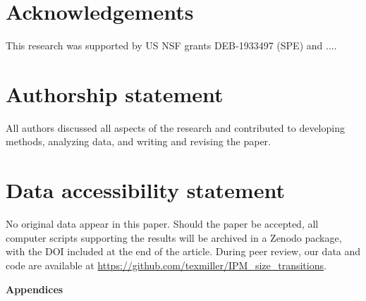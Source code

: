 \documentclass[12pt]{article}
\begin{document}
\section*{Acknowledgements} 
This research was supported by US NSF grants DEB-1933497 (SPE) and .... 

\section{Authorship statement} 
All authors discussed all aspects of the research and contributed to developing methods, analyzing data, and writing and revising the paper.  

\section{Data accessibility statement}
No original data appear in this paper. Should the paper be accepted, all computer scripts supporting the results will be archived in a Zenodo package, with the DOI included at the end of the article. 
During peer review, our data and code are available at \url{https://github.com/texmiller/IPM_size_transitions}. 
	
\newpage 

%



\newpage 
\clearpage 
\setcounter{equation}{0}
\setcounter{figure}{0}
\setcounter{section}{0}
\setcounter{table}{0}
\setcounter{Box}{0}
\renewcommand{\theequation}{S.\arabic{equation}}
\renewcommand{\thetable}{S-\arabic{table}}
\renewcommand{\thefigure}{S-\arabic{figure}}
\renewcommand{\theBox}{S-\arabic{Box}}
\renewcommand{\thesection}{S.\arabic{section}}

\centerline{\Large{\textbf{Appendices}}}
\end{document}
